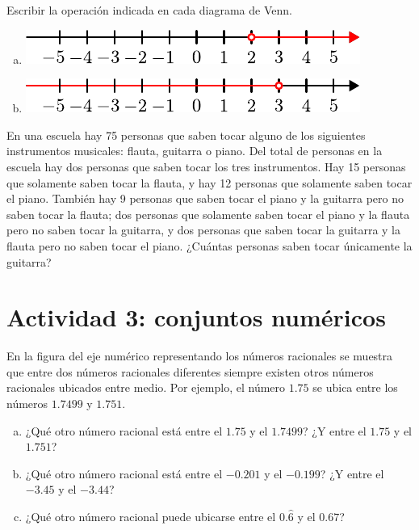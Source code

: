 \documentclass[11pt]{article}
\begin{document}
\begin{exercise}
Escribir la operación indicada en cada diagrama de Venn.
\begin{multicols}{2}
    \begin{enumerate}[a)]
        \item \includegraphics[scale=1.0]{figs/fig-10.pdf}
        \item \includegraphics[scale=1.0]{figs/fig-11.pdf}
    \end{enumerate}
\end{multicols}
\end{exercise}

\begin{exercise}
En una escuela hay 75 personas que saben tocar alguno de los siguientes instrumentos musicales: flauta, guitarra o piano. Del total de personas en la escuela hay dos personas que saben tocar los tres instrumentos. Hay 15 personas que solamente saben tocar la flauta, y hay 12 personas que solamente saben tocar el piano. También hay 9 personas que saben tocar el piano y la guitarra pero no saben tocar la flauta; dos personas que solamente saben tocar el piano y la flauta pero no saben tocar la guitarra, y dos personas que saben tocar la guitarra y la flauta pero no saben tocar el piano. ¿Cuántas personas saben tocar únicamente la guitarra?
\end{exercise}


\section*{Actividad 3: conjuntos numéricos}

\begin{exercise}
En la figura del eje numérico representando los números racionales se muestra que entre dos números racionales diferentes siempre existen otros números racionales ubicados entre medio. Por ejemplo, el número $1.75$ se ubica entre los números $1.7499$ y $1.751$.
\begin{enumerate}[a)]
    \item ¿Qué otro número racional está entre el $1.75$ y el $1.7499$? ¿Y entre el $1.75$ y el $1.751$?
    \item ¿Qué otro número racional está entre el $-0.201$ y el $-0.199$? ¿Y entre el $-3.45$ y el $-3.44$?
    \item ¿Qué otro número racional puede ubicarse entre el $0.\hat{6}$ y el $0.67$?
\end{enumerate}
\end{exercise}
\end{document}

